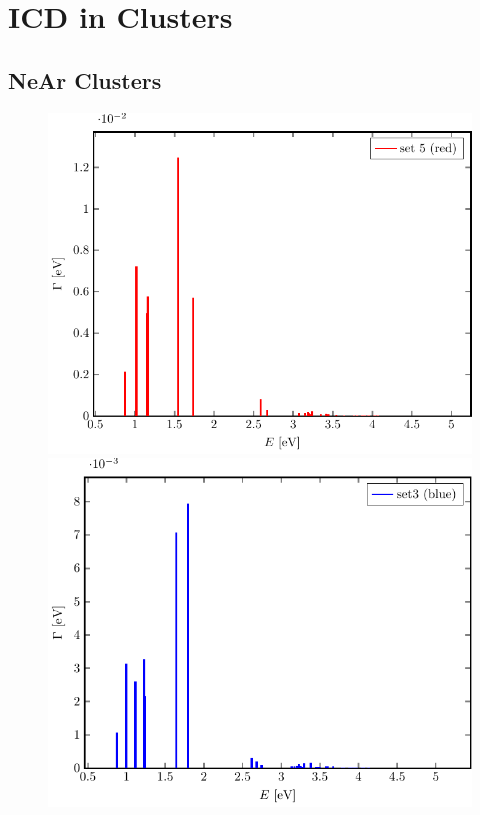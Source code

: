\section{ICD in Clusters}

\subsection{NeAr Clusters}
\begin{figure}[h]
 \centering
 \includegraphics[width=\columnwidth]{pics/rot.pdf}\\
 \includegraphics[width=\columnwidth]{pics/blue.pdf}

\end{figure}
